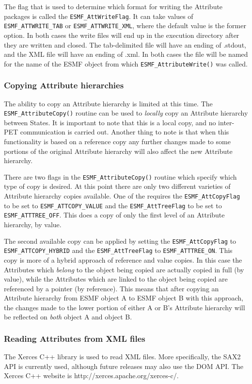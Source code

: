 The flag that is used to determine which format for writing the Attribute packages is called the {\tt ESMF\_AttWriteFlag}.  It can take values of {\tt ESMF\_ATTWRITE\_TAB} or {\tt ESMF\_ATTWRITE\_XML}, where the default value is the former option.  In both cases the write files will end up in the execution directory after they are written and closed.  The tab-delimited file will have an ending of .stdout, and the XML file will have an ending of .xml.  In both cases the file will be named for the name of the ESMF object from which {\tt ESMF\_AttributeWrite()} was called.

\subsubsection{Copying Attribute hierarchies}

The ability to copy an Attribute hierarchy is limited at this time.  The {\tt ESMF\_AttributeCopy()} routine can be used to {\it locally} copy an Attribute hierarchy between States.  It is important to note that this is a local copy, and no inter-PET communication is carried out.  Another thing to note is that when this functionality is based on a reference copy any further changes made to some portions of the original Attribute hierarchy will also affect the new Attribute hierarchy.

There are two flags in the {\tt ESMF\_AttributeCopy()} routine which specify which type of copy is desired.  At this point there are only two different varieties of Attribute hierarchy copies available.  One of the requires the {\tt ESMF\_AttCopyFlag} to be set to {\tt ESMF\_ATTCOPY\_VALUE} and the {\tt ESMF\_AttTreeFlag} to be set to {\tt ESMF\_ATTTREE\_OFF}.  This does a copy of only the first level of an Attribute hierarchy, by value.

The second available copy can be applied by setting the {\tt ESMF\_AttCopyFlag} to {\tt ESMF\_ATTCOPY\_HYBRID} and the {\tt ESMF\_AttTreeFlag} to {\tt ESMF\_ATTTREE\_ON}.  This copy is more of a hybrid approach of reference and value copies.  In this case the Attributes which {\it belong} to the object being copied are actually copied in full (by value), while the Attributes which are linked to the object being copied are referenced by a pointer (by reference).  This means that after copying an Attribute hierarchy from ESMF object A to ESMF object B with this approach, the changes made to the lower portion of either A or B's Attribute hierarchy will be reflected on {\it both} object A and object B.

\subsubsection{Reading Attributes from XML files}

The Xerces C++ library is used to read XML files.  More specifically, the SAX2 API is currently used, although future releases may also use the DOM API.  The Xerces C++ website is http://xerces.apache.org/xerces-c/.
